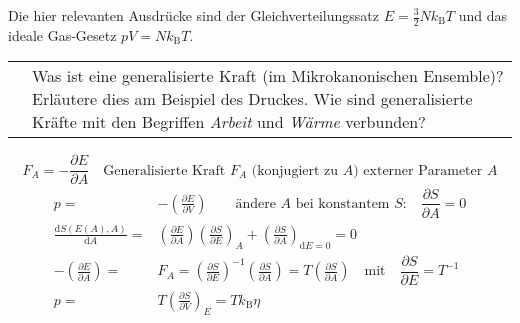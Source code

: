 \documentclass[a4paper,12pt]{scrartcl}
\makeatletter
\def\pf#1#2{\frac{\partial #1}{\partial #2}}		%
\def\dpf#1#2{\dfrac{\partial #1}{\partial #2}}		%
\def\ka#1{\left(#1\right)}				%
\def\d{\mathrm{d}}					%
\def\kB{k_\mathrm{B}}					%
\newcounter{qc}\setcounter{qc}{1}
\newenvironment{fshaded}{
\def\FrameCommand{\fcolorbox{framecolor}{shadecolor}}
\MakeFramed {\FrameRestore}}
{\endMakeFramed}
\def\frage#1{
\begin{fshaded}
\noindent
\begin{tabularx}{0.99\textwidth}{@{}c!{\color{framecolor}\vline}X}
{ \bf \rm \theqc }	&	\noindent #1
\end{tabularx}
\stepcounter{qc}
\end{fshaded}
}
\makeatother
\begin{document}
Die hier relevanten Ausdrücke sind der Gleichverteilungssatz $E=\frac32N\kB T$ und das ideale Gas-Gesetz $pV=N\kB T$.



\frage{Was ist eine generalisierte Kraft (im Mikrokanonischen Ensemble)? Erläutere dies am Beispiel des Druckes. Wie sind 
generalisierte Kräfte mit den Begriffen \textit{Arbeit} und \textit{Wärme} verbunden?}
\noindent
\[F_A=-\pf EA\quad\text{Generalisierte Kraft $F_A$ (konjugiert zu $A$) externer Parameter $A$}\]
\begin{align*}
	p=&-\ka{\pf EV}\qquad\text{ändere $A$ bei konstantem $S$:$\quad\dpf SA=0$}\\
	\frac{\d S(E(A),A)}{\d A}=&\ka{\pf EA}\ka{\pf SE}_A+\ka{\pf SA}_{\d E=0}=0\\
	-\ka{\pf EA}=&F_A=\ka{\pf SE}^{-1}\ka{\pf SA}=T\ka{\pf SA} \quad \text{mit}\quad\dpf SE=T^{-1}\\
	p=&T\ka{\pf SV}_E=T\kB \eta
\end{align*}

\end{document}

